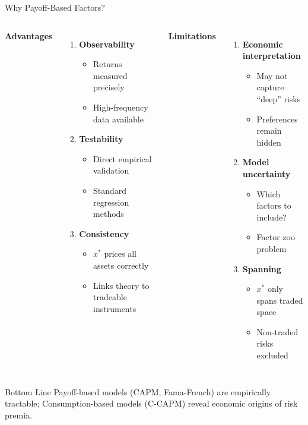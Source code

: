 \documentclass{beamer}
\begin{document}
\begin{frame}{Why Payoff-Based Factors?}
	\begin{columns}[T]
		\textbf{Advantages}
		\begin{enumerate}
			\item \textbf{Observability}
			\begin{itemize}
				\item Returns measured precisely
				\item High-frequency data available
			\end{itemize}
			\item \textbf{Testability}
			\begin{itemize}
				\item Direct empirical validation
				\item Standard regression methods
			\end{itemize}
			\item \textbf{Consistency}
			\begin{itemize}
				\item $x^*$ prices all assets correctly
				\item Links theory to tradeable instruments
			\end{itemize}
		\end{enumerate}
		
		\textbf{Limitations}
		\begin{enumerate}
			\item \textbf{Economic interpretation}
			\begin{itemize}
				\item May not capture ``deep'' risks
				\item Preferences remain hidden
			\end{itemize}
			\item \textbf{Model uncertainty}
			\begin{itemize}
				\item Which factors to include?
				\item Factor zoo problem
			\end{itemize}
			\item \textbf{Spanning}
			\begin{itemize}
				\item $x^*$ only spans traded space
				\item Non-traded risks excluded
			\end{itemize}
		\end{enumerate}
	\end{columns}
	
	\vspace{8pt}
	\begin{block}{Bottom Line}
		Payoff-based models (CAPM, Fama-French) are empirically tractable; Consumption-based models (C-CAPM) reveal economic origins of risk premia.
	\end{block}
\end{frame}
\end{document}
